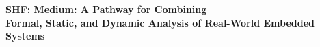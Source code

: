 \documentclass[11pt]{article}
\begin{document}
\begin{center}
  \Large\bf SHF: Medium: A Pathway for Combining\\Formal, Static, and
  Dynamic Analysis of Real-World Embedded Systems
\end{center}













\newpage
\setcounter{page}{1}



\end{document}
